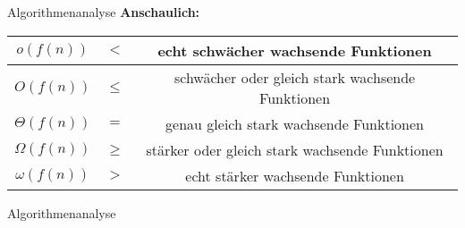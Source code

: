 \begin{frame}{Algorithmenanalyse}
	\textbf{Anschaulich:} \\[0,125cm]
	{
		
		\renewcommand{\arraystretch}{2}%
		\begin{tabular}{ | c | c | c | }
			\hline
			$     o (f(n))$ & $<$ & echt schwächer wachsende Funktionen
			\\ \hline
			$     O (f(n))$ & $\leq$ & schwächer oder gleich stark wachsende Funktionen
			\\ \hline
			$\Theta (f(n))$ & $=$ & genau gleich stark wachsende Funktionen
			\\ \hline
			$\Omega (f(n))$ & $\geq$ & stärker oder gleich stark wachsende Funktionen
			\\ \hline
			$\omega (f(n))$ & $>$ & echt stärker wachsende Funktionen
			\\ \hline
		\end{tabular}
		\renewcommand{\arraystretch}{\stdarraystretch}
	}
\end{frame}


\begin{frame}[t]{Algorithmenanalyse}
	
	
	
	
	
	
	
\end{frame}


